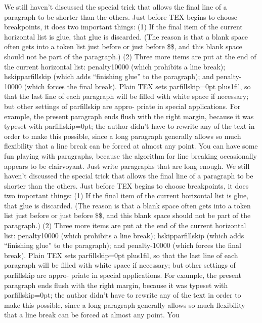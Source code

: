 \hangindent=-40pt  
We still haven’t discussed the special trick that allows the final line of a paragraph 
to be shorter than the others. Just before TEX begins to choose breakpoints, 
it does two important things: (1) If the final item of the current horizontal
list is glue, that glue is discarded. (The reason is that a blank space often gets into a
token list just before or just before \$\$, and this blank space should not be part
of the paragraph.) (2) Three more items are put at the end of the current horizontal
list: penalty10000 (which prohibits a line break); hskipparfillskip (which adds
“finishing glue” to the paragraph); and penalty-10000 (which forces the final break).
Plain TEX sets parfillskip=0pt plus1fil, so that the last line of each paragraph will
be filled with white space if necessary; but other settings of parfillskip are appro-
priate in special applications. For example, the present paragraph ends flush with the
right margin, because it was typeset with parfillskip=0pt; the author didn’t have to
rewrite any of the text in order to make this possible, since a long paragraph generally
allows so much flexibility that a line break can be forced at almost any point. You
can have some fun playing with paragraphs, because the algorithm for line breaking
occasionally appears to be clairvoyant. Just write paragraphs that are long enough.
\hfil\vadjust{\vskip\parskip}\break\indent
We still haven’t discussed the special trick that allows the final line of a paragraph 
to be shorter than the others. Just before TEX begins to choose breakpoints, 
it does two important things: (1) If the final item of the current horizontal
list is glue, that glue is discarded. (The reason is that a blank space often gets into a
token list just before or just before \$\$, and this blank space should not be part
of the paragraph.) (2) Three more items are put at the end of the current horizontal
list: penalty10000 (which prohibits a line break); hskipparfillskip (which adds
“finishing glue” to the paragraph); and penalty-10000 (which forces the final break).
Plain TEX sets parfillskip=0pt plus1fil, so that the last line of each paragraph will
be filled with white space if necessary; but other settings of parfillskip are appro-
priate in special applications. For example, the present paragraph ends flush with the
right margin, because it was typeset with parfillskip=0pt; the author didn’t have to
rewrite any of the text in order to make this possible, since a long paragraph generally
allows so much flexibility that a line break can be forced at almost any point. You
